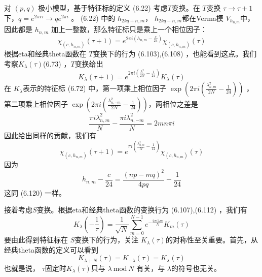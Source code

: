对 $(p,q)$ 极小模型，基于特征标的定义 (6.22) 考虑$ T $变换。在 $T $变换 $\tau \rightarrow \tau+1$ 下，$ q=e^{2\pi i \tau} \rightarrow q e^{2 \pi i}$ 。 (6.22) 中的 $h_{2 k q+n, m} $， $h_{2 k q-n, m} $都在Verma模 $V_{h_{n, m}} $中，因此都是 $h_{n, m}$ 加上一整数，那么特征标只是乘上一个相位因子：
\begin{equation}
	\chi_{\left(c, h_{n, m}\right)}(\tau+1)=e^{2 \pi i\left(h_{n, m}-\frac{c}{24}\right)} \chi_{\left(c, h_{n, m}\right)}(\tau)
\end{equation} 
根据eta和经典theta函数在 $T $变换下的行为 (6.103),(6.108) ，也能看到这点。我们考察$ K_{\lambda}(\tau) $(6.73) ，$ T $变换给出
\begin{equation}
	K_{\lambda}(\tau+1)=e^{2 \pi i\left(\frac{\lambda^{2}}{2 N}-\frac{1}{24}\right)} K_{\lambda}(\tau)
\end{equation}
在 $K_\lambda $表示的特征标 (6.72) 中，第一项乘上相位因子 $\exp \left(2 \pi i\left(\frac{\lambda_{n, m}^{2}}{2 N}-\frac{1}{24}\right)\right)$ ，第二项乘上相位因子 $\exp \left(2 \pi i\left(\frac{\lambda_{n,-m}^{2}}{2 N}-\frac{1}{24}\right)\right) $，两相位之差是
$$
\frac{\pi i \lambda_{n, m}^{2}}{N}-\frac{\pi i \lambda_{n,-m}^{2}}{N}=2 m n \pi i
$$
因此给出同样的贡献，我们有
$$
\chi_{\left(c, h_{n, m}\right)}(\tau+1)=e^{\pi i\left(\frac{\lambda_{n, m}^{2}}{N}-\frac{1}{12}\right)} \chi_{\left(c, h_{n, m}\right)}(\tau)
$$
因为
$$
h_{n, m}-\frac{c}{24}=\frac{(n p-m q)^{2}}{4 p q}-\frac{1}{24}
$$
这同 (6.120) 一样。

接着考虑$ S $变换。根据eta和经典theta函数的变换行为 (6.107),(6.112) ，我们有
\begin{equation}
K_{\lambda}\left(-\frac{1}{\tau}\right)=\frac{1}{\sqrt{N}} \sum_{m=0}^{N-1} e^{-\frac{2 \pi i \lambda m}{N}} K_{m}(\tau)
\end{equation} 
要由此得到特征标在 $S$变换下的行为，关注 $K_{\lambda}(\tau) $的对称性至关重要。首先，从经典theta函数的定义可以看到
\begin{equation}
	K_{\lambda+N}(\tau)=K_{-\lambda}(\tau)=K_{\lambda}(\tau)
\end{equation} 
也就是说， $\tau $固定时$ K_{\lambda}(\tau) $只与 $\lambda\ \text{mod} \ N$ 有关，与 $\lambda $的符号也无关。

